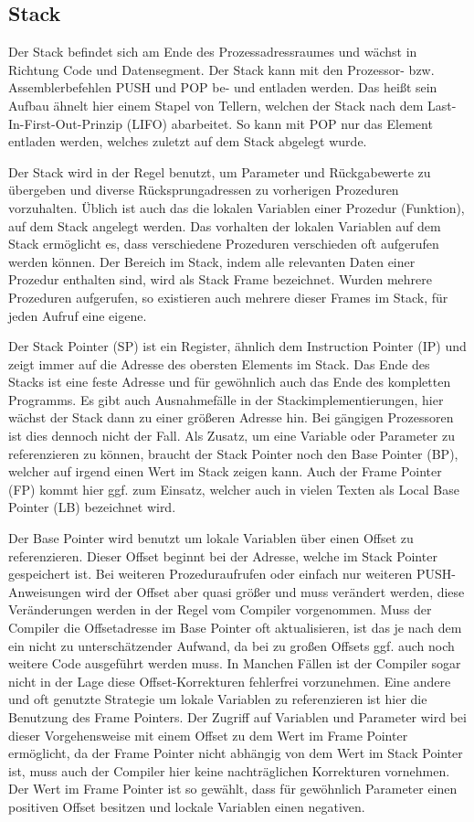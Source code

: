 \documentclass[12pt]{book}
\begin{document}
\subsection{Stack}

Der Stack befindet sich am Ende des Prozessadressraumes und wächst in Richtung
Code und Datensegment. Der Stack kann mit den Prozessor- bzw. Assemblerbefehlen
PUSH und POP be- und entladen werden. Das heißt sein Aufbau ähnelt hier einem
Stapel von Tellern, welchen der Stack nach dem Last-In-First-Out-Prinzip (LIFO)
abarbeitet. So kann mit POP nur das Element entladen werden, welches zuletzt
auf dem Stack abgelegt wurde.

Der Stack wird in der Regel benutzt, um Parameter und Rückgabewerte zu übergeben
und diverse Rücksprungadressen zu vorherigen Prozeduren vorzuhalten.  Üblich ist
auch das die lokalen Variablen einer Prozedur (Funktion), auf dem Stack angelegt
werden. Das vorhalten der lokalen Variablen auf dem Stack ermöglicht es, dass
verschiedene Prozeduren verschieden oft aufgerufen werden können. Der Bereich im
Stack, indem alle relevanten Daten einer Prozedur enthalten sind, wird als Stack
Frame bezeichnet. Wurden mehrere Prozeduren aufgerufen, so existieren auch
mehrere dieser Frames im Stack, für jeden Aufruf eine eigene.

Der Stack Pointer (SP) ist ein Register, ähnlich dem Instruction Pointer (IP)
und zeigt immer auf die Adresse des obersten Elements im Stack. Das Ende des
Stacks ist eine feste Adresse und für gewöhnlich auch das Ende des kompletten
Programms. Es gibt auch Ausnahmefälle in der Stackimplementierungen, hier wächst
der Stack dann zu einer größeren Adresse hin. Bei gängigen Prozessoren ist dies
dennoch nicht der Fall. Als Zusatz, um eine Variable oder Parameter zu
referenzieren zu können, braucht der Stack Pointer noch den Base Pointer (BP),
welcher auf irgend einen Wert im Stack zeigen kann. Auch der Frame Pointer (FP)
kommt hier ggf. zum Einsatz, welcher auch in vielen Texten als Local Base
Pointer (LB) bezeichnet wird.

Der Base Pointer wird benutzt um lokale Variablen über einen Offset zu
referenzieren. Dieser Offset beginnt bei der Adresse, welche im Stack Pointer
gespeichert ist. Bei weiteren Prozeduraufrufen oder einfach nur weiteren
PUSH-Anweisungen wird der Offset aber quasi größer und muss verändert werden,
diese Veränderungen werden in der Regel vom Compiler vorgenommen. Muss der
Compiler die Offsetadresse im Base Pointer oft aktualisieren, ist das je nach
dem ein nicht zu unterschätzender Aufwand, da bei zu großen Offsets ggf. auch
noch weitere Code ausgeführt werden muss. In Manchen Fällen ist der Compiler
sogar nicht in der Lage diese Offset-Korrekturen fehlerfrei vorzunehmen. Eine
andere und oft genutzte Strategie um lokale Variablen zu referenzieren ist hier
die Benutzung des Frame Pointers. Der Zugriff auf Variablen und Parameter wird
bei dieser Vorgehensweise mit einem Offset zu dem Wert im Frame Pointer
ermöglicht, da der Frame Pointer nicht abhängig von dem Wert im Stack Pointer
ist, muss auch der Compiler hier keine nachträglichen Korrekturen vornehmen. Der
Wert im Frame Pointer ist so gewählt, dass für gewöhnlich Parameter einen
positiven Offset besitzen und lockale Variablen einen negativen.
\end{document}
